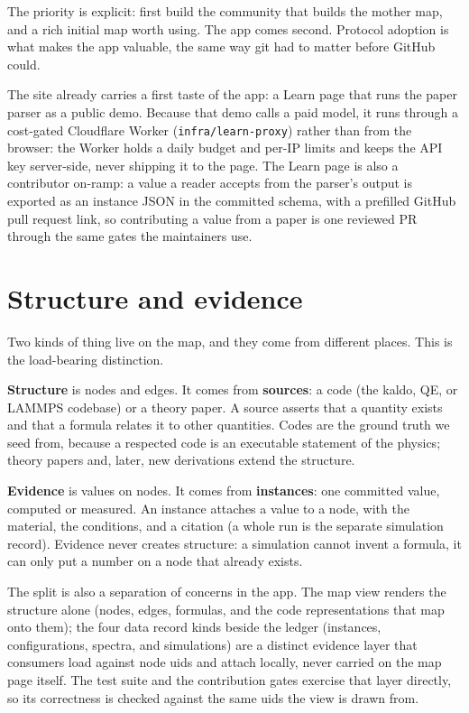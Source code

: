 \documentclass[11pt,a4paper]{article}
\begin{document}
The priority is explicit: first build the community that builds the mother map,
and a rich initial map worth using. The app comes second. Protocol adoption is
what makes the app valuable, the same way git had to matter before GitHub
could.

The site already carries a first taste of the app: a Learn page that runs the
paper parser as a public demo. Because that demo calls a paid model, it runs
through a cost-gated Cloudflare Worker (\texttt{infra/learn-proxy}) rather than
from the browser: the Worker holds a daily budget and per-IP limits and keeps the
API key server-side, never shipping it to the page. The Learn page is also a
contributor on-ramp: a value a reader accepts from the parser's output is
exported as an instance JSON in the committed schema, with a prefilled GitHub pull
request link, so contributing a value from a paper is one reviewed PR through the
same gates the maintainers use.

\section{Structure and evidence}

Two kinds of thing live on the map, and they come from different places. This
is the load-bearing distinction.

\textbf{Structure} is nodes and edges. It comes from \textbf{sources}: a code (the kaldo,
QE, or LAMMPS codebase) or a theory paper. A source asserts that a quantity
exists and that a formula relates it to other quantities. Codes are the ground
truth we seed from, because a respected code is an executable statement of the
physics; theory papers and, later, new derivations extend the structure.

\textbf{Evidence} is values on nodes. It comes from \textbf{instances}: one
committed value, computed or measured. An instance attaches a value to a node,
with the material, the conditions, and a citation (a whole run is the separate
simulation record). Evidence never creates structure: a
simulation cannot invent a formula, it can only put a number on a node that
already exists.

The split is also a separation of concerns in the app. The map view renders the
structure alone (nodes, edges, formulas, and the code representations that map
onto them); the four data record kinds beside the ledger (instances,
configurations, spectra, and simulations) are a distinct evidence layer that
consumers load against node uids and attach locally, never carried on the map
page itself.
The test suite and the contribution gates exercise that layer directly, so its
correctness is checked against the same uids the view is drawn from.
\end{document}
